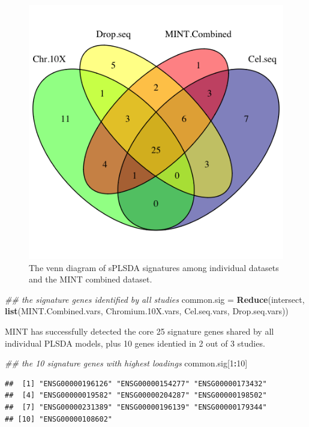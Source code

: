 \documentclass[]{book}
\newenvironment{Shaded}{\begin{snugshade}}{\end{snugshade}}
\newcommand{\CommentTok}[1]{\textcolor[rgb]{0.56,0.35,0.01}{\textit{#1}}}
\newcommand{\DecValTok}[1]{\textcolor[rgb]{0.00,0.00,0.81}{#1}}
\newcommand{\FloatTok}[1]{\textcolor[rgb]{0.00,0.00,0.81}{#1}}
\newcommand{\KeywordTok}[1]{\textcolor[rgb]{0.13,0.29,0.53}{\textbf{#1}}}
\newcommand{\NormalTok}[1]{#1}
\newcommand{\OperatorTok}[1]{\textcolor[rgb]{0.81,0.36,0.00}{\textbf{#1}}}
\newcommand{\StringTok}[1]{\textcolor[rgb]{0.31,0.60,0.02}{#1}}
\theoremstyle{definition}
\theoremstyle{definition}
\theoremstyle{definition}
\theoremstyle{remark}
\begin{document}
\begin{figure}[ht]

{\centering \includegraphics[width=0.55\linewidth]{figures/vennMINT} 

}

\caption{ The venn diagram of sPLSDA signatures among individual datasets and the MINT combined dataset.}\label{fig:2-vennMINTShow}
\end{figure}

\begin{Shaded}
\begin{Highlighting}[]
\CommentTok{## the signature genes identified by all studies}
\NormalTok{common.sig =}\StringTok{ }\KeywordTok{Reduce}\NormalTok{(intersect, }\KeywordTok{list}\NormalTok{(MINT.Combined.vars, Chromium}\FloatTok{.10}\NormalTok{X.vars, Cel.seq.vars, Drop.seq.vars))}
\end{Highlighting}
\end{Shaded}

MINT has successfully detected the core 25 signature genes shared by all
individual PLSDA models, plus 10 genes identied in 2 out of 3 studies.

\begin{Shaded}
\begin{Highlighting}[]
\CommentTok{## the 10 signature genes with highest loadings}
\NormalTok{common.sig[}\DecValTok{1}\OperatorTok{:}\DecValTok{10}\NormalTok{]}
\end{Highlighting}
\end{Shaded}

\begin{verbatim}
##  [1] "ENSG00000196126" "ENSG00000154277" "ENSG00000173432"
##  [4] "ENSG00000019582" "ENSG00000204287" "ENSG00000198502"
##  [7] "ENSG00000231389" "ENSG00000196139" "ENSG00000179344"
## [10] "ENSG00000108602"
\end{verbatim}
\end{document}
